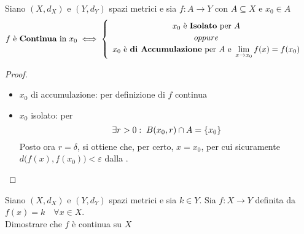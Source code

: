 \begin{proposition}
	\label{prop:f_cont_se_isol_o_accum}
	Siano $(X,d_X)$ e $(Y,d_Y)$ spazi metrici e sia $f: A \to Y$ con $A \subseteq X$ e $x_0 \in A$
	\begin{equation*}
		f \text{ è \textbf{Continua} in } x_0 \iff
		\begin{cases}
			\begin{array}{c}
				x_0 \text{ è \textbf{Isolato} per } A\\
				oppure\\
				x_0 \text{ è \textbf{di Accumulazione} per } A \text{ e } \lim\limits_{x \to x_0} f(x) = f(x_0)
			\end{array}
		\end{cases}
	\end{equation*}
	\begin{proof}~
		\begin{itemize}
			\item $x_0$ di accumulazione: per definizione di $f$ continua
			\item $x_0$ isolato: per 
				\[\exists r > 0:\; B(x_0, r) \cap A = \left\{x_0\right\}\]
				Posto ora $r = \delta$, si ottiene che, per certo, $x = x_0$, per cui sicuramente $d\bigl( f(x), f(x_0) \bigr) < \varepsilon$ dalla .
		\end{itemize}
	\end{proof}
\end{proposition}
\begin{exercise}
	Siano $(X,d_X)$ e $(Y,d_Y)$ spazi metrici e sia $k \in Y$. Sia $f:X \to Y$ definita da $f(x) = k \quad \forall x \in X$.\\
	Dimostrare che $f$ è continua su $X$
\end{exercise}

